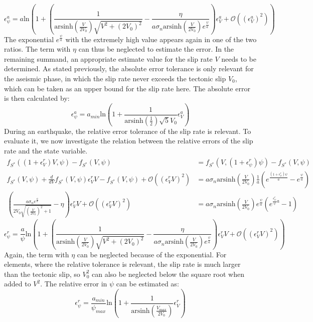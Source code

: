 \documentclass{report}
\begin{document}
\begin{equation}
	 \epsilon_\psi^a 
	= a\text{ln}\left(1 + \left( \frac{1}{\text{arsinh}\left(\frac{V}{2V_0}\right)\sqrt{V^2 + (2V_0)^2}} - \frac{\eta}{a \sigma_n \text{arsinh}\left(\frac{V}{2V_0}\right) e^{\frac{\psi}{a}}} \right)\epsilon_V^a + \mathcal{O}\left(\left(\epsilon_V^a\right)^2\right)\right)
\end{equation}
The exponential $e^{\frac{\psi}{a}}$ with the extremely high value appears again in one of the two ratios. The term with $\eta$ can thus be neglected to estimate the error. In the remaining summand, an appropriate estimate value for the slip rate $V$ needs to be determined. As stated previously, the absolute error tolerance is only relevant for the aseismic phase, in which the slip rate never exceeds the tectonic slip $V_0$, which can be taken as an upper bound for the slip rate here. The absolute error is then calculated by: 
\begin{equation}
	\label{eq:absoluteErrorPSIFromV}
	 \epsilon_\psi^a 
	= a_{min}\text{ln}\left(1 +  \frac{1}{\text{arsinh}\left(\frac{1}{2}\right)\sqrt{5}V_0}\epsilon_V^a\right)
\end{equation}
During an earthquake, the relative error tolerance of the slip rate is relevant. To evaluate it, we now investigate the relation between the relative errors of the slip rate and the state variable. 
\begin{align}
	f_{S^*}((1+\epsilon_V^r)V,\psi) - f_{S^*}(V,\psi) &= f_{S^*}(V,(1+\epsilon_\psi^r)\psi) - f_{S^*}(V,\psi) \\
	f_{S^*}(V,\psi) + \frac{d}{dV}f_{S^*}(V,\psi)\epsilon_V^rV - f_{S^*}(V,\psi) + \mathcal{O}\left(\left(\epsilon_V^rV\right)^2\right)&= a \sigma_n \text{arsinh}\left(\frac{V}{2V_0}\right)\frac{1}{a}\left(e^{\frac{(1+\epsilon_\psi^r)\psi}{a}} - e^{\frac{\psi}{a}}\right) \\
	\left( \frac{a\sigma_ne^{\frac{\psi}{a}}} {2V_0\sqrt{\left(\frac{V}{2V_0}\right)^2+1}}- \eta \right)\epsilon_V^rV + \mathcal{O}\left(\left(\epsilon_V^rV\right)^2\right) &= a \sigma_n \text{arsinh}\left(\frac{V}{2V_0}\right) e^{\frac{\psi}{a}}\left(e^{\frac{\epsilon_\psi^r}\psi{a}} - 1\right)
\end{align}
\begin{equation}
	\epsilon_\psi^r = \frac{a}{\psi}\text{ln}\left(1 + \left( \frac{1}{\text{arsinh}\left(\frac{V}{2V_0}\right)\sqrt{V^2 + (2V_0)^2}} - \frac{\eta}{a \sigma_n \text{arsinh}\left(\frac{V}{2V_0}\right) e^{\frac{\psi}{a}}} \right)\epsilon_V^rV + \mathcal{O}\left(\left(\epsilon_V^rV\right)^2\right)\right)
\end{equation}
Again, the term with $\eta$ can be neglected because of the exponential. For elements, where the relative tolerance is relevant, the slip rate is much larger than the tectonic slip, so $V_0^2$ can also be neglected below the square root when added to $V^2$. The relative error in $\psi$ can be estimated as: 
\begin{equation}
	\label{eq:relativeErrorPSIFromV}
	\epsilon_\psi^r = \frac{a_{min}}{\psi_{max}}\text{ln}\left(1 + \frac{1}{\text{arsinh}\left(\frac{V_{max}}{2V_0}\right)}\epsilon_V^r\right)
\end{equation}
\end{document}

